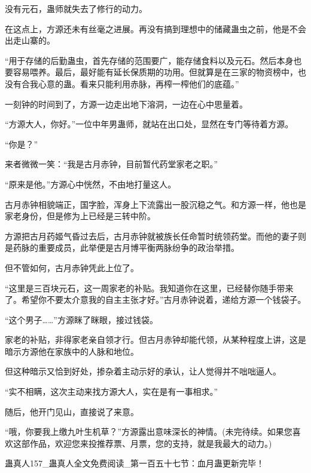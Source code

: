 \begin{this_body}
没有元石，蛊师就失去了修行的动力。

在这点上，方源还未有丝毫之进展。再没有搞到理想中的储藏蛊虫之前，他是不会出走山寨的。

“用于存储的后勤蛊虫，首先存储的范围要广，能存储食料以及元石。然后本身也要容易喂养。最后，最好能有延长保质期的功用。但就算是在三家的物资榜中，也没有合我心意的蛊。看来只能利用赤脉，再榨一榨他们的底蕴。”

一刻钟的时间到了，方源一边走出地下溶洞，一边在心中思量着。

“方源大人，你好。”一位中年男蛊师，就站在出口处，显然在专门等待着方源。

“你是？”

来者微微一笑：“我是古月赤钟，目前暂代药堂家老之职。”

“原来是他。”方源心中恍然，不由地打量这人。

古月赤钟相貌端正，国字脸，浑身上下流露出一股沉稳之气。和方源一样，他也是家老身份，但是修为上已经是三转中阶。

方源把古月药姬气昏过去后，古月赤钟就被族长任命暂时统领药堂。而他的妻子则是药脉的重要成员，此举便是古月博平衡两脉纷争的政治举措。

但不管如何，古月赤钟凭此上位了。

“这里是三百块元石，这一周家老的补贴。我知道你在这里，已经替你随手带来了。希望你不要太介意我的自主主张才好。”古月赤钟说着，递给方源一个钱袋子。

“这个男子……”方源眯了眯眼，接过钱袋。

家老的补贴，非得家老亲自领才行。但古月赤钟却能代领，从某种程度上讲，这是暗示方源他在家族中的人脉和地位。

但这种暗示又恰到好处，掺杂着主动示好的承认，让人觉得并不咄咄逼人。

“实不相瞒，这次主动来找方源大人，实在是有一事相求。”

随后，他开门见山，直接说了来意。

“哦，你要我上缴九叶生机草？”方源露出意味深长的神情。(未完待续。如果您喜欢这部作品，欢迎您来投推荐票、月票，您的支持，就是我最大的动力。)

蛊真人157\_蛊真人全文免费阅读\_第一百五十七节：血月蛊更新完毕！

\end{this_body}

